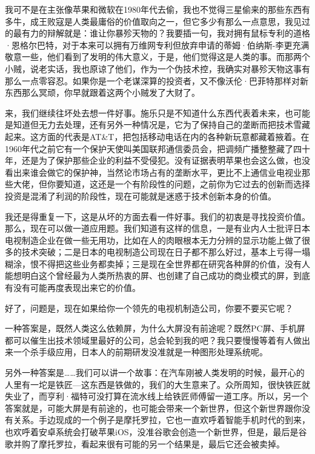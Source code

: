 我可不是在主张像苹果和微软在1980年代去偷，我也不觉得三星偷来的那些东西有多牛，成王败寇是人类最庸俗的价值取向之一，但它多少有那么一点意思，我见过的最有力的辩解就是：谁让你暴殄天物的？我要插一句，我对拥有鼠标专利的道格·恩格尔巴特，对于本来可以拥有万维网专利但放弃申请的蒂姆·伯纳斯-李更充满敬意一些，他们看到了发明的伟大意义，于是，他们觉得这是人类的事。而那两个小贼，说老实话，我也原谅了他们，作为一个伪技术控，我确实对暴殄天物这事有那么一点零容忍。如果你是一个老谋深算的投资者，又不像沃伦·巴菲特那样对新东西那么冥顽，你早就跟着这两个小贼发了大财了。

来，我们继续往坏处去想一件好事。施乐只是不知道什么东西代表着未来，也可能是知道但无力去处理，还有另外一种情况是，它为了保持自己的垄断而把技术雪藏起来。这方面的代表是AT\&T，把包括移动电话在内的各种新玩意都藏着掖着。在1960年代之前它有一个保护天使叫美国联邦通信委员会，把调频广播整整藏了四十年，还是为了保护那些企业的利益不受侵犯。没有证据表明苹果也会这么做，也没看出来谁会做它的保护神，当然论市场占有的垄断水平，更比不上通信业电视业那些大佬，但你要知道，这还是一个有阶段性的问题，之前你为它过去的创新而选择投资是混淆了利润的阶段性，现在可能就是迷惑于技术创新本身的价值。

我还是得重复一下，这是从坏的方面去看一件好事。我们的初衷是寻找投资价值。那么，现在可以做一道应用题。我们知道有这样的信息，一是有业内人士批评日本电视制造企业在做一些无用功，比如在人的肉眼根本无力分辨的显示功能上做了很多的技术突破；二是日本的电视制造公司现在日子都不那么好过，基本上亏得一塌糊涂，恨不得把这些业务都卖掉；三是现在全世界都在研究各种屏的价值，没有人能想明白这个曾经最为人类所热衷的屏、也创建了自己成功的商业模式的屏，到底有没有可能再度表现出来它的价值。

好了，问题是，现在如果给你一个领先的电视机制造公司，你要不要买它呢？

一种答案是，既然人类这么依赖屏，为什么大屏没有前途呢？既然PC屏、手机屏都可以催生出技术领域里最好的公司，总会轮到我的吧？我只要慢慢等着有人做出来一个杀手级应用，日本人的前期研发没准就是一种图形处理系统呢。

另外一种答案是\ldots{}\ldots{}我们可以讲一个故事：在汽车刚被人类发明的时候，最开心的人里有一坨是铁匠---这东西是铁做的，我们的大生意来了。众所周知，很快铁匠就失业了，而亨利·福特可没打算在流水线上给铁匠师傅留一道工序。所以，另一个答案就是，可能大屏是有前途的，也可能会带来一个新世界，但这个新世界跟你没有关系。手边现成的一个例子是摩托罗拉，它也一直欢呼着智能手机时代的到来，也欢呼着安卓系统会打破苹果iOS，没准谷歌会创造一个新世界，但是，最后是谷歌并购了摩托罗拉，看起来很有可能的另一个结果是，最后它还会被卖掉。

